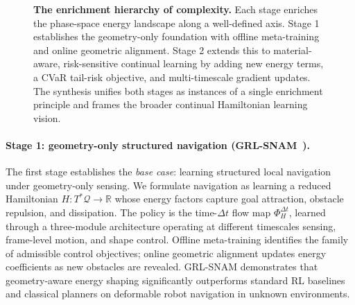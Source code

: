 \begin{figure}[htbp]
\caption{%
  \textbf{The enrichment hierarchy of complexity.}
  Each stage enriches the phase-space energy landscape along a well-defined
  axis.
  Stage 1 establishes the
  geometry-only foundation with offline meta-training and online geometric
  alignment.
  Stage 2 extends this to material-aware,
  risk-sensitive continual learning by adding new energy terms, a CVaR
  tail-risk objective, and multi-timescale gradient updates.
  The synthesis unifies both stages as
  instances of a single enrichment principle and frames the broader
  continual Hamiltonian learning vision.
}
\label{fig:intro:hierarchy}
\end{figure}

\paragraph{Stage 1: geometry-only structured navigation (GRL-SNAM~\citep{ellendula2025grlsnam}).}
The first stage establishes the \emph{base case}: learning structured local
navigation under geometry-only sensing.
We formulate navigation as learning a reduced Hamiltonian
$H : T^*\mathcal{Q} \to \mathbb{R}$ whose energy factors capture goal
attraction, obstacle repulsion, and dissipation.
The policy is the time-$\Delta t$ flow map $\Phi^{\Delta t}_H$, learned through a three-module
architecture operating at different timescales sensing, frame-level motion,
and shape control.
Offline meta-training identifies the family of admissible control objectives;
online geometric alignment updates energy coefficients as new obstacles are
revealed.
GRL-SNAM demonstrates that geometry-aware energy shaping significantly
outperforms standard RL baselines
and classical planners on deformable robot navigation in unknown environments.

